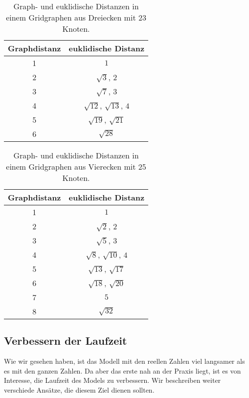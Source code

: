 \documentclass[
	fontsize=12pt,
	paper=a4,
	twoside=false,
	numbers=noenddot,
	plainheadsepline,
	toc=listof,
	toc=bibliography
]{scrartcl}
\begin{document}
\begin{table}[htbp]
\centering
  \begin{tabular}{|c|c|}
  \hline
   Graphdistanz	& euklidische Distanz \\ \hline
		1	& $1$\\
		2	& $\sqrt{3}$, $2$\\
		3	& $\sqrt{7}$, $3$\\
		4	& $\sqrt{12}$, $\sqrt{13}$, $4$\\
		5	& $\sqrt{19}$, $\sqrt{21}$\\
		6	& $\sqrt{28}$\\
  \hline
  \end{tabular}
\caption{Graph- und euklidische Distanzen in einem Gridgraphen aus Dreiecken mit 23 Knoten.}
\label{TreppFunk2}
\end{table}

\begin{table}[htbp]
\centering
  \begin{tabular}{|c|c|}
  \hline
   Graphdistanz	& euklidische Distanz \\ \hline
		1	& $1$\\
		2	& $\sqrt{2}$, $2$\\
		3	& $\sqrt{5}$, $3$\\
		4	& $\sqrt{8}$, $\sqrt{10}$, $4$\\
		5	& $\sqrt{13}$, $\sqrt{17}$\\
		6	& $\sqrt{18}$, $\sqrt{20}$\\
		7	& $5$\\
		8	& $\sqrt{32}$\\
  \hline
  \end{tabular}
\caption{Graph- und euklidische Distanzen in einem Gridgraphen aus Vierecken mit 25 Knoten.}
\label{TreppFunk3}
\end{table}

\FloatBarrier 
\subsection{Verbessern der Laufzeit}
Wie wir gesehen haben, ist das Modell mit den reellen Zahlen viel langsamer als es mit den ganzen Zahlen. Da aber das erste nah an der Praxis liegt, ist es von Interesse, die Laufzeit des Models zu verbessern. 
Wir beschreiben weiter verschiede Ansätze, die diesem Ziel dienen sollten.
\end{document}
